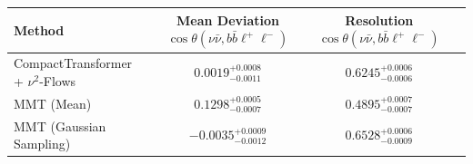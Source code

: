     \begin{tabular}{lccc}
        \toprule
        Method & Mean Deviation $\cos\theta(\nu\bar{\nu}, b\bar{b}\ell^+\ell^-)$ & Resolution $\cos\theta(\nu\bar{\nu}, b\bar{b}\ell^+\ell^-)$ \\
        \midrule
        CompactTransformer + $\nu^2$-Flows & $0.0019^{+0.0008}_{-0.0011}$ & $0.6245^{+0.0006}_{-0.0006}$ \\
        MMT (Mean) & $0.1298^{+0.0005}_{-0.0007}$ & $0.4895^{+0.0007}_{-0.0007}$ \\
        MMT (Gaussian Sampling) & $-0.0035^{+0.0009}_{-0.0012}$ & $0.6528^{+0.0006}_{-0.0009}$ \\
        \bottomrule
    \end{tabular}